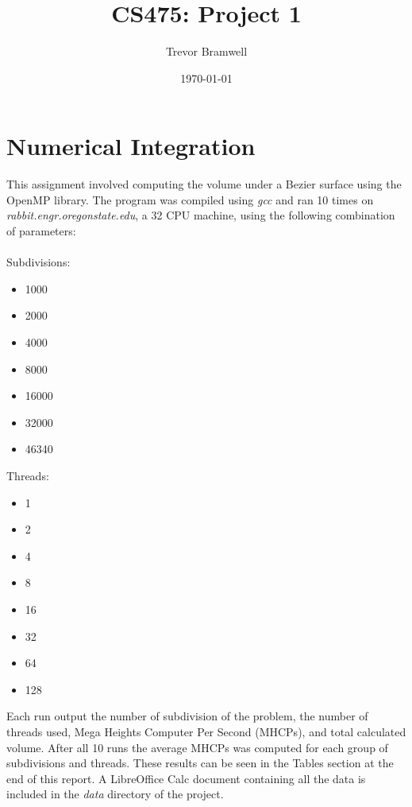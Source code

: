 \documentclass[12pt]{article}
\title{CS475: Project 1}
\author{Trevor Bramwell}
\date{\today}
\begin{document}
\maketitle

\section*{Numerical Integration}

This assignment involved computing the volume under a Bezier surface using
the OpenMP library. The program was compiled using \emph{gcc} and ran 10
times on \emph{rabbit.engr.oregonstate.edu}, a 32 CPU machine, using the
following combination of parameters:
\\
\\
Subdivisions:
\begin{multicols}{2}
\begin{itemize}
    \item 1000
    \item 2000
    \item 4000
    \item 8000
    \item 16000
    \item 32000
    \item 46340
\end{itemize}
\end{multicols}

\noindent Threads:
\begin{multicols}{2}
\begin{itemize}
    \item 1
    \item 2
    \item 4
    \item 8
    \item 16
    \item 32
    \item 64
    \item 128
\end{itemize}
\end{multicols}

\noindent Each run output the number of subdivision of the problem, the
number of threads used, Mega Heights Computer Per Second (MHCPs), and
total calculated volume. After all 10 runs the average MHCPs was
computed for each group of subdivisions and threads. These results can
be seen in the Tables section at the end of this report. A LibreOffice
Calc document containing all the data is included in the \emph{data}
directory of the project.
\end{document}

